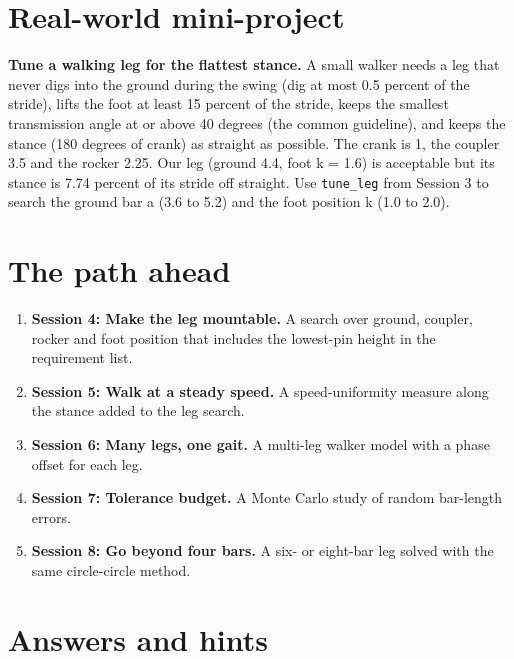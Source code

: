 \documentclass[11pt,a4paper]{article}
\begin{document}
\section{Real-world mini-project}
\textbf{Tune a walking leg for the flattest stance.} A small walker needs a leg that never digs into the ground during the swing (dig at most 0.5 percent of the stride), lifts the foot at least 15 percent of the stride, keeps the smallest transmission angle at or above 40 degrees (the common guideline), and keeps the stance (180 degrees of crank) as straight as possible. The crank is 1, the coupler 3.5 and the rocker 2.25. Our leg (ground 4.4, foot k = 1.6) is acceptable but its stance is 7.74 percent of its stride off straight. Use \texttt{tune\_leg} from Session 3 to search the ground bar a (3.6 to 5.2) and the foot position k (1.0 to 2.0).

\section{The path ahead}
\begin{enumerate}[nosep]
\item \textbf{Session 4: Make the leg mountable.} A search over ground, coupler, rocker and foot position that includes the lowest-pin height in the requirement list.
\item \textbf{Session 5: Walk at a steady speed.} A speed-uniformity measure along the stance added to the leg search.
\item \textbf{Session 6: Many legs, one gait.} A multi-leg walker model with a phase offset for each leg.
\item \textbf{Session 7: Tolerance budget.} A Monte Carlo study of random bar-length errors.
\item \textbf{Session 8: Go beyond four bars.} A six- or eight-bar leg solved with the same circle-circle method.
\end{enumerate}

\section{Answers and hints}
\end{document}
